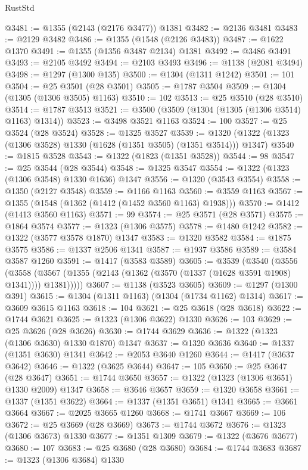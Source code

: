 \begin{lexlean}{RustStd}
\begin{coremodule}
@3481 := @1355 (@2143 (@2176 @3477)) @1381
@3482 := @2136 @3481
@3483 := @2129 @3482
@3486 := @1355 (@1548 (@2126 @3483))
@3487 := @1622 @1370
@3491 := @1355 (@1356 @3487 @2134) @1381
@3492 := @3486 @3491
@3493 := @2105 @3492
@3494 := @2103 @3493
@3496 := @1138 (@2081 @3494)
@3498 := @1297 (@1300 @135)
@3500 := @1304 (@1311 @1242)
@3501 := 101
@3504 := @25 @3501 (@28 @3501)
@3505 := @1787 @3504
@3509 := @1304 (@1305 (@1306 @3505) @1163)
@3510 := 102
@3513 := @25 @3510 (@28 @3510)
@3514 := @1787 @3513
@3521 := @3500 (@3509 (@1304 (@1305 (@1306 @3514) @1163) @1314))
@3523 := @3498 @3521 @1163
@3524 := 100
@3527 := @25 @3524 (@28 @3524)
@3528 := @1325 @3527
@3539 := @1320 (@1322 (@1323 (@1306 @3528) @1330 (@1628 (@1351 @3505) (@1351 @3514))) @1347)
@3540 := @1815 @3528
@3543 := @1322 (@1823 (@1351 @3528))
@3544 := 98
@3547 := @25 @3544 (@28 @3544)
@3548 := @1325 @3547
@3554 := @1322 (@1323 (@1306 @3548) @1330 @1636) @1347
@3556 := @1320 (@3543 @3554)
@3558 := @1350 (@2127 @3548)
@3559 := @1166 @1163
@3560 := @3559 @1163
@3567 := @1355 (@1548 (@1362 (@1412 (@1452 @3560 @1163) @1938)))
@3570 := @1412 (@1413 @3560 @1163)
@3571 := 99
@3574 := @25 @3571 (@28 @3571)
@3575 := @1864 @3574
@3577 := @1323 (@1306 @3575)
@3578 := @1480 @1242
@3582 := @1322 (@3577 @3578 @1870) @1347
@3583 := @1320 @3582
@3584 := @1875 @3575
@3586 := @1337 @2506 @1341
@3587 := @1937 @3586
@3589 := @3584 @3587 @1260
@3591 := @1417 (@3583 @3589)
@3605 := @3539
    (@3540
      (@3556
        (@3558 (@3567 (@1355 (@2143 (@1362 (@3570 (@1337 (@1628 @3591 @1908) @1341)))) @1381)))))
@3607 := @1138 (@3523 @3605)
@3609 := @1297 (@1300 @391)
@3615 := @1304 (@1311 @1163) (@1304 (@1734 @1162) @1314)
@3617 := @3609 @3615 @1163
@3618 := 104
@3621 := @25 @3618 (@28 @3618)
@3622 := @1744 @3621
@3625 := @1323 (@1306 @3622) @1330
@3626 := 103
@3629 := @25 @3626 (@28 @3626)
@3630 := @1744 @3629
@3636 := @1322 (@1323 (@1306 @3630) @1330 @1870) @1347
@3637 := @1320 @3636
@3640 := @1337 (@1351 @3630) @1341
@3642 := @2053 @3640 @1260
@3644 := @1417 (@3637 @3642)
@3646 := @1322 (@3625 @3644)
@3647 := 105
@3650 := @25 @3647 (@28 @3647)
@3651 := @1744 @3650
@3657 := @1322 (@1323 (@1306 @3651) @1330 @2009) @1347
@3658 := @3646 @3657
@3659 := @1320 @3658
@3661 := @1337 (@1351 @3622)
@3664 := @1337 (@1351 @3651) @1341
@3665 := @3661 @3664
@3667 := @2025 @3665 @1260
@3668 := @1741 @3667
@3669 := 106
@3672 := @25 @3669 (@28 @3669)
@3673 := @1744 @3672
@3676 := @1323 (@1306 @3673) @1330
@3677 := @1351 @1309
@3679 := @1322 (@3676 @3677)
@3680 := 107
@3683 := @25 @3680 (@28 @3680)
@3684 := @1744 @3683
@3687 := @1323 (@1306 @3684) @1330

\end{coremodule}
\end{lexlean}
